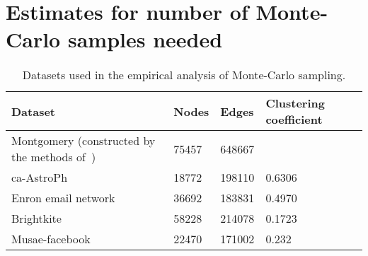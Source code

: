 
\section{Estimates for number of Monte-Carlo samples needed}
\label{sec:experiments}

\begin{table}[!ht]
\centering
\begin{small}
\begin{tabular}{|p{3in}|l|l|p{1.0in}|}
\hline
 \textbf{Dataset} & \textbf{Nodes} & \textbf{Edges} & \textbf{Clustering coefficient}  \\ 
\hline
 Montgomery (constructed by the methods of~\cite{barrett:wsc09,eubank:nature04}) & 75457 & 648667 & \\
 ca-AstroPh~\cite{snap} & 18772 & 198110 & 0.6306\\
 Enron email network~\cite{snap} & 36692 & 183831 & 0.4970 \\   
 Brightkite~\cite{snap} & 58228 & 214078 & 0.1723 \\ 
Musae-facebook~\cite{snap} & 22470 & 171002 & 0.232 \\ \hline
\end{tabular}
\end{small}
\caption{Datasets used in the empirical analysis of Monte-Carlo sampling.}
\label{tab:datasets}
\end{table}

